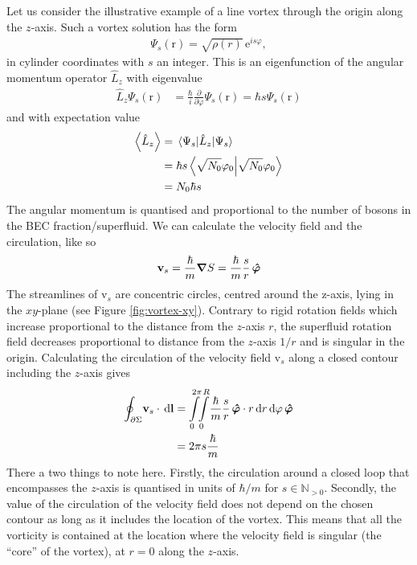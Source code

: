 \documentclass[12pt,a4paper]{book}
\renewcommand{\vec}[1]{\bm{\mathrm{#1}}}
\newcommand{\unit}[1]{\,\mathrm{#1}}
\begin{document}
			Let us consider the illustrative example of a line vortex through the origin along the $z$-axis. Such a vortex solution has the form
			\begin{align}
				\Psi_s(\vec{r}) = \sqrt{\rho(r)}\unit{e}^{is\varphi}, \label{eq:line-vortex}
			\end{align}
			in cylinder coordinates with $s$ an integer. This is an eigenfunction of the angular momentum operator $\hat{L}_z$ with eigenvalue
			\begin{align}
				\hat{L}_z \Psi_s(\vec{r}) &= \frac{\hbar}{i}\frac{\partial}{\partial\varphi}\Psi_s(\vec{r}) = \hbar s\Psi_s(\vec{r})
			\end{align}
			and with expectation value
			\begin{align}
				\expval{\hat{L}_z} &= \expval{\hat{L}_z}{\Psi_s} \\
					&= \hbar s \braket{\sqrt{N_0}\varphi_0} \\
					&= N_0\hbar s
			\end{align}
			The angular momentum is quantised and proportional to the number of bosons in the BEC fraction/superfluid. We can calculate the velocity field and the circulation, like so
			\begin{align}
				\vec{v}_s = \frac{\hbar}{m}\grad{S} = \frac{\hbar}{m}\frac{s}{r}\,\vu*{\varphi}
			\end{align}
			The streamlines of $\vec{v}_s$ are concentric circles, centred around the z-axis, lying in the $xy$-plane (see Figure \ref{fig:vortex-xy}). Contrary to rigid rotation fields which increase proportional to the distance from the $z$-axis $r$, the superfluid rotation field decreases proportional to distance from the $z$-axis $1/r$ and is singular in the origin. Calculating the circulation of the velocity field $\vec{v}_s$ along a closed contour including the $z$-axis gives
			\begin{align}
				\oint_{\partial\Sigma}\!\vec{v}_s\cdot\unit{d}\vec{l} &=
				\int\displaylimits_{0}^{2\pi}\!\!\int\displaylimits_{0}^{R}\!\frac{\hbar}{m}\frac{s}{r}\,\vu*{\varphi}\cdot r\unit{d}r\unit{d}\varphi\,\vu*{\varphi} \\
					&= 2\pi s\frac{\hbar}{m}
			\end{align}
			There a two things to note here. Firstly, the circulation around a closed loop that encompasses the $z$-axis is quantised in units of $\hbar/m$ for $s\in\mathbb{N}_{>0}$. Secondly, the value of the circulation of the velocity field does not depend on the chosen contour as long as it includes the location of the vortex. This means that all the vorticity is contained at the location where the velocity field is singular (the ``core'' of the vortex), at $r=0$ along the $z$-axis.\\
			
\end{document}
